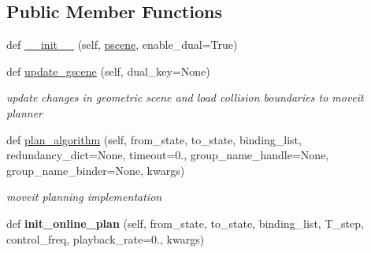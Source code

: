 \subsection*{Public Member Functions}
\begin{DoxyCompactItemize}
\item 
def \hyperlink{classrnb-planning_1_1src_1_1pkg_1_1planning_1_1motion_1_1moveit_1_1moveit__planner_1_1_moveit_planner_aa7d0c47bf8634074bc0a4e28e8f7a082}{\+\_\+\+\_\+init\+\_\+\+\_\+} (self, \hyperlink{classrnb-planning_1_1src_1_1pkg_1_1planning_1_1motion_1_1interface_1_1_motion_interface_a00c505ee267290c0439334e007b216bd}{pscene}, enable\+\_\+dual=True)
\item 
def \hyperlink{classrnb-planning_1_1src_1_1pkg_1_1planning_1_1motion_1_1moveit_1_1moveit__planner_1_1_moveit_planner_ab811d10be6f7b96c26dab7560be0af5a}{update\+\_\+gscene} (self, dual\+\_\+key=None)
\begin{DoxyCompactList}\small\item\em update changes in geometric scene and load collision boundaries to moveit planner \end{DoxyCompactList}\item 
def \hyperlink{classrnb-planning_1_1src_1_1pkg_1_1planning_1_1motion_1_1moveit_1_1moveit__planner_1_1_moveit_planner_a08890929bf73cebf282d70294d53bd83}{plan\+\_\+algorithm} (self, from\+\_\+state, to\+\_\+state, binding\+\_\+list, redundancy\+\_\+dict=None, timeout=0., group\+\_\+name\+\_\+handle=None, group\+\_\+name\+\_\+binder=None, kwargs)
\begin{DoxyCompactList}\small\item\em moveit planning implementation \end{DoxyCompactList}\item 
\mbox{\label{classrnb-planning_1_1src_1_1pkg_1_1planning_1_1motion_1_1moveit_1_1moveit__planner_1_1_moveit_planner_ab249d8972e595a5732392e543e62af99}} 
def {\bfseries init\+\_\+online\+\_\+plan} (self, from\+\_\+state, to\+\_\+state, binding\+\_\+list, T\+\_\+step, control\+\_\+freq, playback\+\_\+rate=0., kwargs)
\item 
\mbox{\label{classrnb-planning_1_1src_1_1pkg_1_1planning_1_1motion_1_1moveit_1_1moveit__planner_1_1_moveit_planner_a66be00a6fd597bfa5c0849ee0f6a40d8}} 

\end{DoxyCompactItemize}
